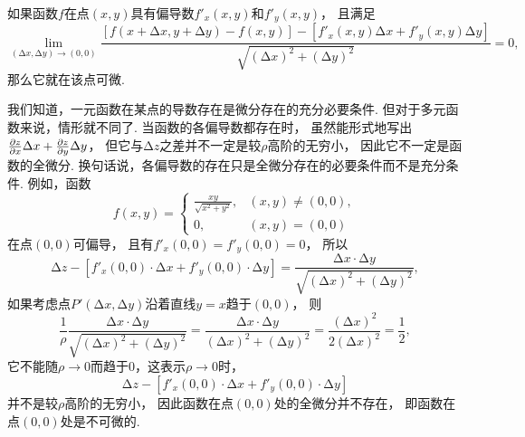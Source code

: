 \begin{theorem}
如果函数\(f\)在点\((x,y)\)具有偏导数\(f'_x(x,y)\)和\(f'_y(x,y)\)，
且满足\[
	\lim_{(\increment x,\increment y)\to(0,0)}
	\frac{
		[f(x+\increment x,y+\increment y)-f(x,y)]
		-[f'_x(x,y) \increment x + f'_y(x,y) \increment y]
	}{
		\sqrt{(\increment x)^2+(\increment y)^2}
	} = 0,
\]那么它就在该点可微.
\end{theorem}

我们知道，一元函数在某点的导数存在是微分存在的充分必要条件.
但对于多元函数来说，情形就不同了.
当函数的各偏导数都存在时，
虽然能形式地写出\(\pdv{z}{x} \Delta x + \pdv{z}{y} \Delta y\)，
但它与\(\increment z\)之差并不一定是较\(\rho\)高阶的无穷小，
因此它不一定是函数的全微分.
换句话说，各偏导数的存在只是全微分存在的必要条件而不是充分条件.
例如，函数\[
	f(x,y) = \left\{ \begin{array}{cl}
		\frac{xy}{\sqrt{x^2+y^2}}, & (x,y)\neq(0,0), \\
		0, & (x,y)=(0,0)
	\end{array} \right.
\]在点\((0,0)\)可偏导，
且有\(f'_x(0,0) = f'_y(0,0) = 0\)，
所以\[
	\increment z - [f'_x(0,0) \cdot \increment x + f'_y(0,0) \cdot \increment y]
	= \frac{\increment x \cdot \increment y}{\sqrt{(\increment x)^2+(\increment y)^2}},
\]
如果考虑点\(P'(\increment x,\increment y)\)沿着直线\(y=x\)趋于\((0,0)\)，
则\[
	\frac{1}{\rho} \frac{\increment x \cdot \increment y}{\sqrt{(\increment x)^2+(\increment y)^2}}
	= \frac{\increment x \cdot \increment y}{(\increment x)^2+(\increment y)^2}
	= \frac{(\increment x)^2}{2(\increment x)^2}
	= \frac{1}{2},
\]
它不能随\(\rho\to0\)而趋于\(0\)，这表示\(\rho\to0\)时，\[
	\increment z - [f'_x(0,0) \cdot \increment x + f'_y(0,0) \cdot \increment y]
\]并不是较\(\rho\)高阶的无穷小，
因此函数在点\((0,0)\)处的全微分并不存在，
即函数在点\((0,0)\)处是不可微的.

